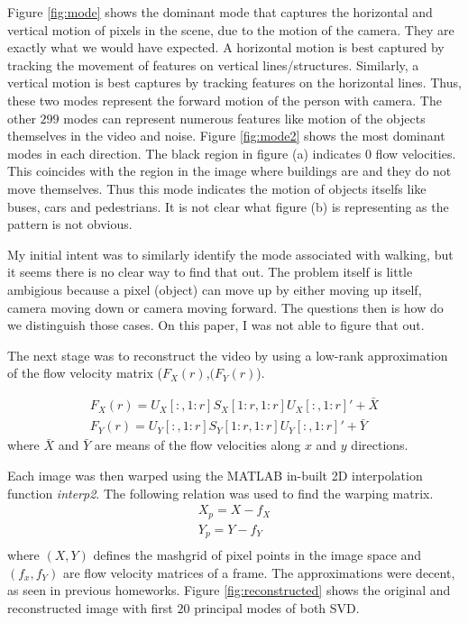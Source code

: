 \documentclass{article}
\begin{document}
Figure \ref{fig:mode} shows the dominant mode that captures the horizontal and vertical motion of pixels in the scene, due to the motion of the camera. They are exactly what we would have expected. A horizontal motion is best captured by tracking the movement of features on vertical lines/structures. Similarly, a vertical motion is best captures by tracking features on the horizontal lines. Thus, these two modes represent the forward motion of the person with camera. The other $299$ modes can represent numerous features like motion of the objects themselves in the video and noise. Figure \ref{fig:mode2} shows the most dominant modes in each direction. The black region in figure (a) indicates $0$ flow velocities. This coincides with the region in the image where buildings are and they do not move themselves. Thus this mode indicates the motion of objects itselfs like buses, cars and pedestrians. It is not clear what figure (b) is representing as the pattern is not obvious.

My initial intent was to similarly identify the mode associated with walking, but it seems there is no clear way to find that out. The problem itself is little ambigious because a pixel (object) can move up by either moving up itself, camera moving down or camera moving forward. The questions then is how do we distinguish those cases. On this paper, I was not able to figure that out.

The next stage was to reconstruct the video by using a low-rank approximation of the flow velocity matrix ($F_X(r)$,$(F_Y(r)$).

\begin{align*}
F_X(r) = U_{X}[:,1:r]S_X[1:r,1:r]U_X[:,1:r]' + \bar{X} \\
F_Y(r) = U_{Y}[:,1:r]S_Y[1:r,1:r]U_Y[:,1:r]' + \bar{Y}
\end{align*}
where $\bar{X}$ and $\bar{Y}$ are means of the flow velocities along $x$ and $y$ directions.

Each image was then warped using the MATLAB in-built 2D interpolation function \emph{interp2}. The following relation was used to find the warping matrix.
\begin{align*}
X_p = X - f_X \\
Y_p = Y - f_Y \\
\end{align*}
where $(X,Y)$ defines the mashgrid of pixel points in the image space and $(f_x,f_Y)$ are flow velocity matrices of a frame. The approximations were decent, as seen in previous homeworks. Figure \ref{fig:reconstructed} shows the original and reconstructed image with first $20$ principal modes of both SVD.
\end{document}
